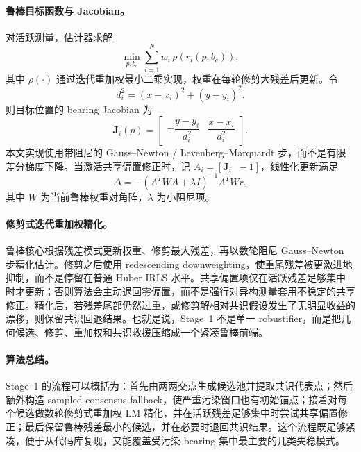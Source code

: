 \documentclass[drones,article,submit,moreauthors]{Definitions/mdpi}
\begin{document}
\paragraph{鲁棒目标函数与 Jacobian。}
对活跃测量，估计器求解
\begin{equation}
\min_{p,b_c}\sum_{i=1}^{N} w_i\,\rho\!\left(r_i(p,b_c)\right),
\end{equation}
其中 $\rho(\cdot)$ 通过迭代重加权最小二乘实现，权重在每轮修剪大残差后更新。令
\begin{equation}
d_i^2=(x-x_i)^2+(y-y_i)^2.
\end{equation}
则目标位置的 bearing Jacobian 为
\begin{equation}
\mathbf{J}_i(p)=
\begin{bmatrix}
-\dfrac{y-y_i}{d_i^2} &
\dfrac{x-x_i}{d_i^2}
\end{bmatrix}.
\end{equation}
本文实现使用带阻尼的 Gauss--Newton / Levenberg--Marquardt 步，而不是有限差分梯度下降。当激活共享偏置修正时，记 $A_i=[\mathbf{J}_i\;\;-1]$，线性化更新满足
\begin{equation}
\Delta = -\left(A^TWA+\lambda I\right)^{-1}A^TWr,
\end{equation}
其中 $W$ 为当前鲁棒权重对角阵，$\lambda$ 为小阻尼项。

\paragraph{修剪式迭代重加权精化。}
鲁棒核心根据残差模式更新权重、修剪最大残差，再以数轮阻尼 Gauss--Newton 步精化估计。修剪之后使用 redescending downweighting，使重尾残差被更激进地抑制，而不是停留在普通 Huber IRLS 水平。共享偏置项仅在活跃残差足够集中时才更新；否则算法会主动退回零偏置，而不是强行对异构测量套用不稳定的共享修正。精化后，若残差尾部仍然过重，或修剪解相对共识假设发生了无明显收益的漂移，则保留共识回退结果。也就是说，Stage~1 不是单一 robustifier，而是把几何候选、修剪、重加权和共识救援压缩成一个紧凑鲁棒前端。

\paragraph{算法总结。}
Stage~1 的流程可以概括为：首先由两两交点生成候选池并提取共识代表点；然后额外构造 sampled-consensus fallback，使严重污染窗口也有初始锚点；接着对每个候选做数轮修剪式重加权 LM 精化，并在活跃残差足够集中时尝试共享偏置修正；最后保留鲁棒残差最小的候选，并在必要时退回共识结果。这个流程既足够紧凑，便于从代码库复现，又能覆盖受污染 bearing 集中最主要的几类失稳模式。
\end{document}

